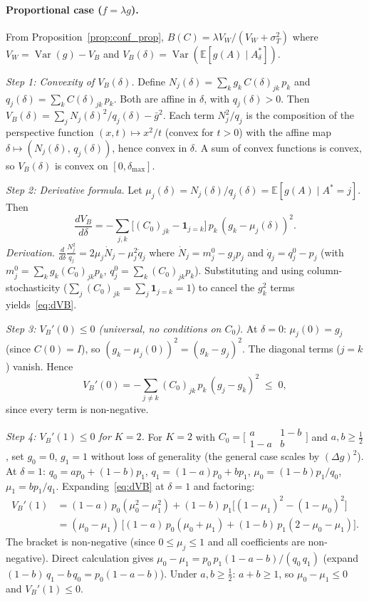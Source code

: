 \paragraph{Proportional case ($f=\lambda g$).}
From Proposition~\ref{prop:conf_prop}, $B(C)=\lambda V_W/(V_W+\sigma_T^2)$ where $V_W=\operatorname{Var}(g)-V_B$ and $V_B(\delta)=\operatorname{Var}(\mathbb{E}[g(A)\mid A^*_\delta])$.

\emph{Step 1: Convexity of $V_B(\delta)$.}
Define $N_j(\delta)=\sum_k g_k\,C(\delta)_{jk}\,p_k$ and $q_j(\delta)=\sum_k C(\delta)_{jk}\,p_k$.
Both are affine in $\delta$, with $q_j(\delta)>0$.
Then $V_B(\delta)=\sum_j N_j(\delta)^2/q_j(\delta) - \bar{g}^2$.
Each term $N_j^2/q_j$ is the composition of the perspective function $(x,t)\mapsto x^2/t$ (convex for $t>0$) with the affine map $\delta\mapsto(N_j(\delta),\,q_j(\delta))$, hence convex in $\delta$.
A sum of convex functions is convex, so $V_B(\delta)$ is convex on $[0,\delta_{\max}]$.

\emph{Step 2: Derivative formula.}
Let $\mu_j(\delta)=N_j(\delta)/q_j(\delta)=\mathbb{E}[g(A)\mid A^*{=}j]$.
Then
\begin{equation}
\frac{dV_B}{d\delta}
= -\sum_{j,k}\bigl[(C_0)_{jk}-\mathbf{1}_{j=k}\bigr]\,p_k\,(g_k-\mu_j(\delta))^2.
\label{eq:dVB}
\end{equation}
\emph{Derivation.}
$\frac{d}{d\delta}\frac{N_j^2}{q_j}=2\mu_j\dot{N}_j-\mu_j^2\dot{q}_j$
where $\dot{N}_j=m_j^0-g_jp_j$ and $\dot{q}_j=q_j^0-p_j$ (with $m_j^0=\sum_k g_k(C_0)_{jk}p_k$, $q_j^0=\sum_k(C_0)_{jk}p_k$).
Substituting and using column-stochasticity ($\sum_j(C_0)_{jk}=\sum_j\mathbf{1}_{j=k}=1$) to cancel the $g_k^2$ terms yields~\eqref{eq:dVB}.

\emph{Step 3: $V_B'(0)\leq 0$ (universal, no conditions on $C_0$).}
At $\delta{=}0$: $\mu_j(0)=g_j$ (since $C(0)=I$), so $(g_k-\mu_j(0))^2=(g_k-g_j)^2$.
The diagonal terms ($j{=}k$) vanish.
Hence
\[
V_B'(0)=-\sum_{j\neq k}(C_0)_{jk}\,p_k\,(g_j-g_k)^2\;\leq\; 0,
\]
since every term is non-negative.

\emph{Step 4: $V_B'(1)\leq 0$ for $K{=}2$.}
For $K{=}2$ with $C_0=\bigl[\begin{smallmatrix}a&1{-}b\\1{-}a&b\end{smallmatrix}\bigr]$ and $a,b\geq\tfrac{1}{2}$,
set $g_0{=}0$, $g_1{=}1$ without loss of generality
(the general case scales by $(\Delta g)^2$).
At $\delta{=}1$: $q_0{=}ap_0{+}(1{-}b)p_1$, $q_1{=}(1{-}a)p_0{+}bp_1$,
$\mu_0{=}(1{-}b)p_1/q_0$, $\mu_1{=}bp_1/q_1$.
Expanding~\eqref{eq:dVB} at $\delta{=}1$ and factoring:
\begin{align*}
  V_B'(1) &= (1{-}a)\,p_0(\mu_0^2{-}\mu_1^2)+(1{-}b)\,p_1\bigl[(1{-}\mu_1)^2{-}(1{-}\mu_0)^2\bigr] \\
  &= (\mu_0{-}\mu_1)\,\bigl[(1{-}a)\,p_0(\mu_0{+}\mu_1)+(1{-}b)\,p_1(2{-}\mu_0{-}\mu_1)\bigr].
\end{align*}
The bracket is non-negative (since $0\leq\mu_j\leq 1$ and all coefficients are non-negative).
Direct calculation gives $\mu_0{-}\mu_1=p_0\,p_1(1{-}a{-}b)/(q_0\,q_1)$
(expand $(1{-}b)\,q_1-b\,q_0=p_0(1{-}a{-}b)$).
Under $a,b\geq\tfrac{1}{2}$: $a{+}b\geq 1$, so $\mu_0{-}\mu_1\leq 0$ and $V_B'(1)\leq 0$.

